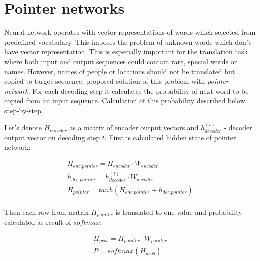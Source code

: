 \section{Pointer networks}
Neural network operates with vector representations of words which selected from predefined vocabulary. This imposes the problem of unknown words which don't have vector representation. This is especially important for the translation task where both input and output sequences could contain rare, special words or names. However, names of people or locations should not be translated but copied to target sequence. \cite{Vinyals2015} proposed solution of this problem with \emph{pointer network}. For each decoding step it calculates the probability of next word to be copied from an input sequence. Calculation of this probability described below step-by-step.

Let's denote $H_{encoder}$ as a matrix of encoder output vectors and $h_{decoder}^{(t)}$ - decoder output vector on decoding step $t$. First is calculated hidden state of pointer network:

\begin{equation}
    \begin{gathered}
    
    H_{enc.pointer} = H_{encoder} \cdot W_{encoder}\\
    
    h_{dec.pointer} = h_{decoder}^{(t)} \cdot W_{decoder}\\
    
    H_{pointer} = tanh(H_{enc.pointer} + h_{dec.pointer})\\
    
    \end{gathered}
    \label{eq:pointer}
\end{equation}

Then each row from matrix $H_{pointer}$ is translated to one value and probability calculated as result of $softmax$:

\begin{equation}
    \begin{gathered}
    
    H_{prob} = H_{pointer} \cdot W_{pointer}\\
    
    P = softmax(H_{prob})\\
    
    \end{gathered}
\end{equation}


